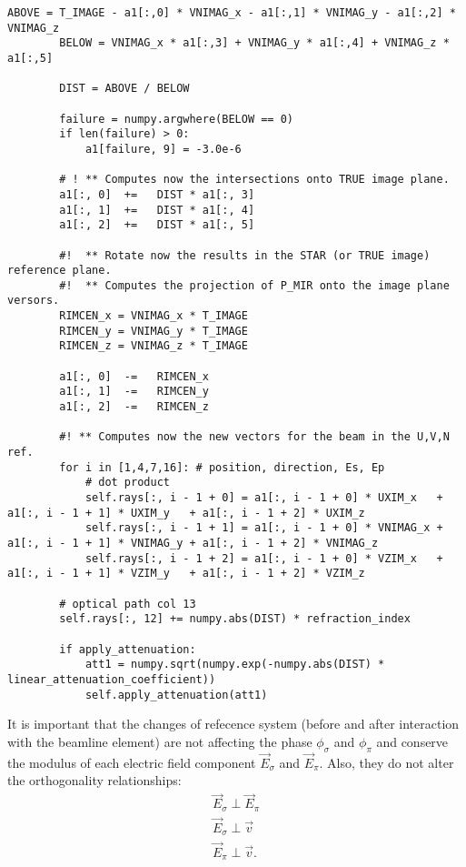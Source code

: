 \documentclass{iucr}
\begin{document}
\begin{lstlisting}[caption={Method of {\tt S4Beam} that changes the reference and propagates the beam from the beamline element to the image plane.}, label={lst:changetoimagereferencesystem}, captionpos=b]
        ABOVE = T_IMAGE - a1[:,0] * VNIMAG_x - a1[:,1] * VNIMAG_y - a1[:,2] * VNIMAG_z
        BELOW = VNIMAG_x * a1[:,3] + VNIMAG_y * a1[:,4] + VNIMAG_z * a1[:,5]

        DIST = ABOVE / BELOW

        failure = numpy.argwhere(BELOW == 0)
        if len(failure) > 0:
            a1[failure, 9] = -3.0e-6

        # ! ** Computes now the intersections onto TRUE image plane.
        a1[:, 0]  +=   DIST * a1[:, 3]
        a1[:, 1]  +=   DIST * a1[:, 4]
        a1[:, 2]  +=   DIST * a1[:, 5]

        #!  ** Rotate now the results in the STAR (or TRUE image) reference plane.
        #!  ** Computes the projection of P_MIR onto the image plane versors.
        RIMCEN_x = VNIMAG_x * T_IMAGE
        RIMCEN_y = VNIMAG_y * T_IMAGE
        RIMCEN_z = VNIMAG_z * T_IMAGE

        a1[:, 0]  -=   RIMCEN_x
        a1[:, 1]  -=   RIMCEN_y
        a1[:, 2]  -=   RIMCEN_z

        #! ** Computes now the new vectors for the beam in the U,V,N ref.
        for i in [1,4,7,16]: # position, direction, Es, Ep
            # dot product
            self.rays[:, i - 1 + 0] = a1[:, i - 1 + 0] * UXIM_x   + a1[:, i - 1 + 1] * UXIM_y   + a1[:, i - 1 + 2] * UXIM_z
            self.rays[:, i - 1 + 1] = a1[:, i - 1 + 0] * VNIMAG_x + a1[:, i - 1 + 1] * VNIMAG_y + a1[:, i - 1 + 2] * VNIMAG_z
            self.rays[:, i - 1 + 2] = a1[:, i - 1 + 0] * VZIM_x   + a1[:, i - 1 + 1] * VZIM_y   + a1[:, i - 1 + 2] * VZIM_z

        # optical path col 13
        self.rays[:, 12] += numpy.abs(DIST) * refraction_index

        if apply_attenuation:
            att1 = numpy.sqrt(numpy.exp(-numpy.abs(DIST) * linear_attenuation_coefficient))
            self.apply_attenuation(att1)
\end{lstlisting}

It is important that the changes of refecence system (before and after interaction with the beamline element)  are not affecting the phase $\phi_\sigma$ and $\phi_\pi$ and conserve the modulus of each electric field component $\vec{E}_\sigma$ and $\vec{E}_\pi$. Also, they do not alter the orthogonality relationships:
\begin{eqnarray}
\label{ortho}
\vec{E}_\sigma \perp \vec{E}_\pi \nonumber \\
\vec{E}_\sigma \perp \vec{v} \nonumber \\
\vec{E}_\pi \perp \vec{v}.
\end{eqnarray}
\end{document}
